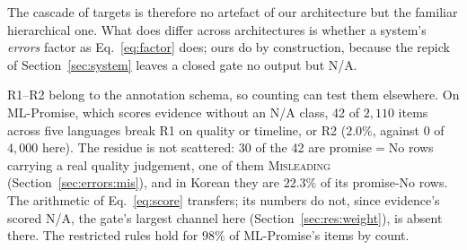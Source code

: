 The cascade of targets is therefore no artefact of our architecture but the familiar hierarchical one. What
does differ across architectures is whether a system's \emph{errors} factor as
Eq.~\eqref{eq:factor} does; ours do by construction, because the repick of
Section~\ref{sec:system} leaves a closed gate no output but N/A.

 R1--R2 belong to the annotation schema, so counting can test
them elsewhere. On ML-Promise, which scores evidence without an N/A class, 42 of $2{,}110$ items
across five languages break R1 on quality or timeline, or R2 ($2.0\%$, against 0 of $4{,}000$ here). The residue is not
scattered: 30 of the 42 are promise${=}$No rows carrying a real quality judgement, one of them
\textsc{Misleading} (Section~\ref{sec:errors:mis}), and in Korean they are $22.3\%$ of its
promise-No rows. The arithmetic of Eq.~\eqref{eq:score} transfers; its numbers do not, since
evidence's scored N/A, the gate's largest channel here (Section~\ref{sec:res:weight}), is absent
there. The restricted rules hold for $98\%$ of ML-Promise's items by count.
